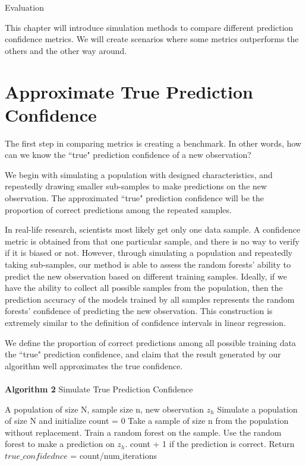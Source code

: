 \documentclass[12pt]{pom_thesis}
\begin{document}
\begin{chapter}{Evaluation}

This chapter will introduce simulation methods to compare different prediction confidence metrics. We will create scenarios where some metrics outperforms the others and the other way around.

\section{Approximate True Prediction Confidence}
The first step in comparing metrics is creating a benchmark. In other words, how can we know the ``true" prediction confidence of a new observation? 

We begin with simulating a population with designed characteristics, and repeatedly drawing smaller sub-samples to make predictions on the new observation. The approximated ``true" prediction confidence will be the proportion of correct predictions among the repeated samples. 

In real-life research, scientists most likely get only one data sample. A confidence metric is obtained from that one particular sample, and there is no way to verify if it is biased or not. However, through simulating a population and repeatedly taking sub-samples, our method is able to assess the random forests' ability to predict the new observation based on different training samples. Ideally, if we have the ability to collect all possible samples from the population, then the prediction accuracy of the models trained by all samples represents the random forests' confidence of predicting the new observation. This construction is extremely similar to the definition of confidence intervals in linear regression.

We define the proportion of correct predictions among all possible training data the ``true" prediction confidence, and claim that the result generated by our algorithm well approximates the true confidence. \\\\

\newline
\hline
\vspace{0.05in}
\textbf{Algorithm 2} Simulate True Prediction Confidence
\vspace{0.05in}
\hline
\begin{algorithm}
\label{avg_confidence}
\label{split}
\begin{algorithmc}
 {A population of size N, sample size n, new observation $z_h$}
 \State Simulate a population of size N and initialize count = 0
 \State Take a sample of size n from the population without replacement.
 \State Train a random forest on the sample.
 \State Use the random forest to make a prediction on $z_h$. count + 1 if the prediction is correct.
 \EndFor
 \State Return $true\_confidednce$ = count/num$\_$iterations
 

\end{algorithmc}
\end{algorithm}
\end{chapter}
\end{document}
